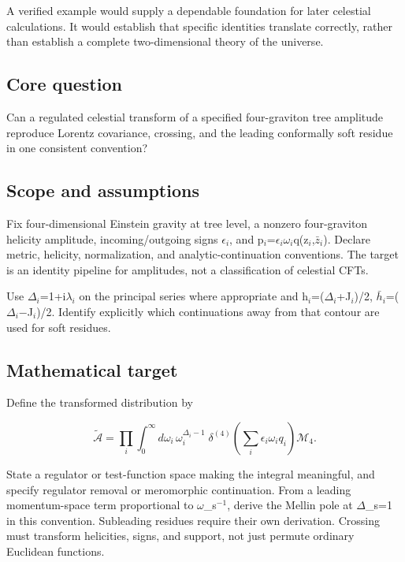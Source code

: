 \documentclass[
  11pt,
]{article}
\begin{document}
A verified example would supply a dependable foundation for later
celestial calculations. It would establish that specific identities
translate correctly, rather than establish a complete two-dimensional
theory of the universe.

\subsection{Core question}

Can a regulated celestial transform of a specified four-graviton tree
amplitude reproduce Lorentz covariance, crossing, and the leading
conformally soft residue in one consistent convention?

\subsection{Scope and assumptions}

Fix four-dimensional Einstein gravity at tree level, a nonzero
four-graviton helicity amplitude, incoming/outgoing signs
\ensuremath{\epsilon}\ensuremath{{}_{i}}, and
p\ensuremath{{}_{i}}=\ensuremath{\epsilon}\ensuremath{{}_{i}}\ensuremath{\omega}\ensuremath{{}_{i}}q(z\ensuremath{{}_{i}},\ensuremath{\bar{z}}\ensuremath{{}_{i}}).
Declare metric, helicity, normalization, and analytic-continuation
conventions. The target is an identity pipeline for amplitudes, not a
classification of celestial CFTs.

Use
\ensuremath{\Delta}\ensuremath{{}_{i}}=1+i\ensuremath{\lambda}\ensuremath{{}_{i}}
on the principal series where appropriate and
h\ensuremath{{}_{i}}=(\ensuremath{\Delta}\ensuremath{{}_{i}}+J\ensuremath{{}_{i}})/2,
\ensuremath{\bar{h}}\ensuremath{{}_{i}}=(\ensuremath{\Delta}\ensuremath{{}_{i}}\ensuremath{-}J\ensuremath{{}_{i}})/2.
Identify explicitly which continuations away from that contour are used
for soft residues.

\subsection{Mathematical target}

Define the transformed distribution by

\[\widetilde{\mathcal A}=\prod_i\int_0^\infty d\omega _i\,\omega _i^{\Delta _i-1}\;\delta ^{(4)}\!\left(\sum_i \epsilon _i\omega _iq_i\right)\mathcal M_4.\]

State a regulator or test-function space making the integral meaningful,
and specify regulator removal or meromorphic continuation. From a
leading momentum-space term proportional to
\ensuremath{\omega}\_s\ensuremath{{}^{-1}}, derive the Mellin pole at
\ensuremath{\Delta}\_s=1 in this convention. Subleading residues require
their own derivation. Crossing must transform helicities, signs, and
support, not just permute ordinary Euclidean functions.
\end{document}
